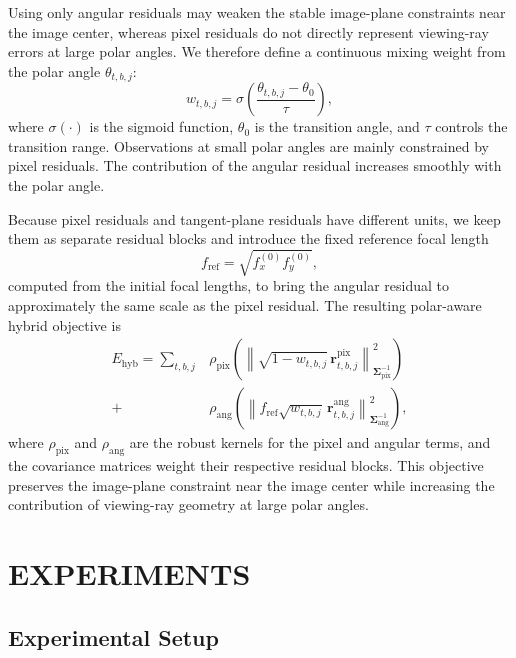 \documentclass[letterpaper, 10 pt, conference]{ieeeconf}  %
\begin{document}
Using only angular residuals may weaken the stable image-plane constraints near
the image center, whereas pixel residuals do not directly represent
viewing-ray errors at large polar angles. We therefore define a continuous
mixing weight from the polar angle $\theta_{t,b,j}$:
\begin{equation}
w_{t,b,j}
=
\sigma\!\left(
\frac{\theta_{t,b,j}-\theta_0}{\tau}
\right),
\label{eq:polar_weight}
\end{equation}
where $\sigma(\cdot)$ is the sigmoid function, $\theta_0$ is the transition
angle, and $\tau$ controls the transition range. Observations at small polar
angles are mainly constrained by pixel residuals. The contribution of the
angular residual increases smoothly with the polar angle.

Because pixel residuals and tangent-plane residuals have different units, we
keep them as separate residual blocks and introduce the fixed reference focal
length
\begin{equation}
f_{\mathrm{ref}}
=
\sqrt{f_x^{(0)}f_y^{(0)}},
\label{eq:reference_focal}
\end{equation}
computed from the initial focal lengths, to bring the angular residual to
approximately the same scale as the pixel residual. The resulting polar-aware
hybrid objective is
\begin{equation}
\begin{split}
E_{\mathrm{hyb}}
=
\sum_{t,b,j}
&\rho_{\mathrm{pix}}\!\left(
\left\|
\sqrt{1-w_{t,b,j}}\,\mathbf{r}_{t,b,j}^{\mathrm{pix}}
\right\|_{\boldsymbol{\Sigma}_{\mathrm{pix}}^{-1}}^{2}
\right)\\
{}+
&\rho_{\mathrm{ang}}\!\left(
\left\|
f_{\mathrm{ref}}\sqrt{w_{t,b,j}}\,
\mathbf{r}_{t,b,j}^{\mathrm{ang}}
\right\|_{\boldsymbol{\Sigma}_{\mathrm{ang}}^{-1}}^{2}
\right),
\end{split}
\label{eq:hybrid_objective}
\end{equation}
where $\rho_{\mathrm{pix}}$ and $\rho_{\mathrm{ang}}$ are the robust kernels
for the pixel and angular terms, and the covariance matrices weight their
respective residual blocks. This objective preserves the image-plane
constraint near the image center while increasing the contribution of
viewing-ray geometry at large polar angles.

\section{EXPERIMENTS}

\subsection{Experimental Setup}
\end{document}
